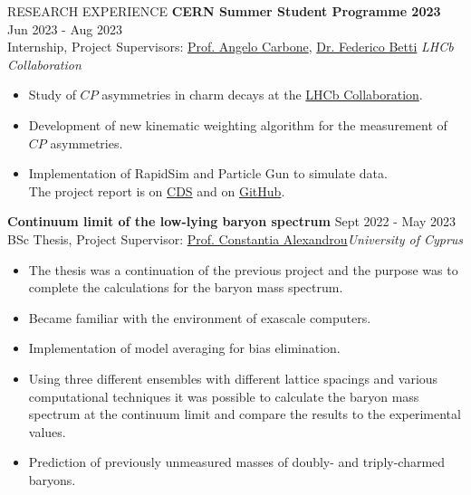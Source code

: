 \documentclass{resume} %
\begin{document}
        \begin{rSection}{RESEARCH EXPERIENCE}
                \textbf{CERN Summer Student Programme 2023} \hfill Jun 2023 - Aug 2023\\
                Internship, Project Supervisors: \href{https://www.unibo.it/sitoweb/angelo.carbone/en}{Prof. Angelo Carbone}, \href{https://www.ph.ed.ac.uk/people/federico-betti}{Dr. Federico Betti}
                \hfill \textit{LHCb Collaboration}
                \begin{itemize}
                        \itemsep -3pt {}
                        \item Study of $CP$ asymmetries in charm decays at the \href{https://lhcb.web.cern.ch/}{LHCb Collaboration}.
                        \item Development of new kinematic weighting algorithm for the measurement of $CP$ asymmetries.
                        \item Implementation of RapidSim and Particle Gun to simulate data.\\ The project report is on \href{https://cds.cern.ch/record/2866568/}{CDS} and on \href{https://github.com/GiorgosChr/CERN_Summer_Student_Programme_2023}{GitHub}.
                \end{itemize}

                \textbf{Continuum limit of the low-lying baryon spectrum} \hfill Sept 2022 - May 2023\\
                BSc Thesis, Project Supervisor:  \href{https://www.cyi.ac.cy/index.php/castorc/about-the-center/castorc-our-people/itemlist/user/99-constantia-alexandrou.html}{Prof. Constantia Alexandrou}\hfill \textit{University of Cyprus}
                \begin{itemize}
                        \itemsep -3pt {} 
                        \item The thesis was a continuation of the previous project and the purpose was to complete the calculations for the baryon mass spectrum.
                        \item Became familiar with the environment of exascale computers.
                        \item Implementation of model averaging for bias elimination.
                        \item Using three different ensembles with different lattice spacings and various computational techniques it was possible to calculate the baryon mass spectrum at the continuum limit and compare the results to the experimental values.
                        \item Prediction of previously unmeasured masses of doubly- and triply-charmed baryons.
                \end{itemize}


\end{rSection}
\end{document}
